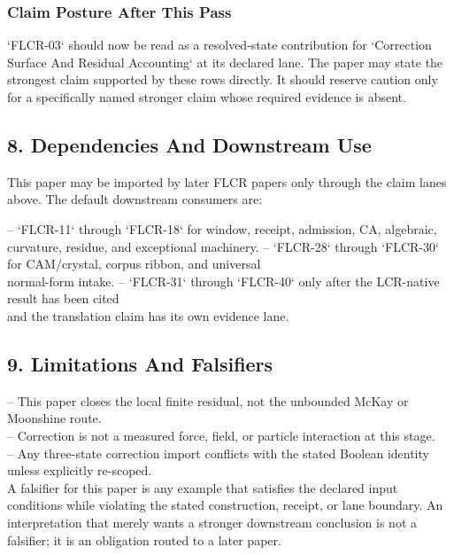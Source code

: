 \documentclass[11pt]{article}
\begin{document}
\subsubsection*{Claim Posture After This Pass}

`FLCR-03` should now be read as a resolved-state contribution for `Correction Surface And Residual Accounting` at its declared lane. The paper may state the strongest claim supported by these rows directly. It should reserve caution only for a specifically named stronger claim whose required evidence is absent.

\subsection*{8. Dependencies And Downstream Use}

This paper may be imported by later FLCR papers only through the claim lanes
above. The default downstream consumers are:

\noindent{}-- `FLCR-11` through `FLCR-18` for window, receipt, admission, CA, algebraic,\\
  curvature, residue, and exceptional machinery.
\noindent{}-- `FLCR-28` through `FLCR-30` for CAM/crystal, corpus ribbon, and universal\\
  normal-form intake.
\noindent{}-- `FLCR-31` through `FLCR-40` only after the LCR-native result has been cited\\
  and the translation claim has its own evidence lane.

\subsection*{9. Limitations And Falsifiers}

\noindent{}-- This paper closes the local finite residual, not the unbounded McKay or Moonshine route.\\
\noindent{}-- Correction is not a measured force, field, or particle interaction at this stage.\\
\noindent{}-- Any three-state correction import conflicts with the stated Boolean identity unless explicitly re-scoped.\\

A falsifier for this paper is any example that satisfies the declared input
conditions while violating the stated construction, receipt, or lane boundary.
An interpretation that merely wants a stronger downstream conclusion is not a
falsifier; it is an obligation routed to a later paper.
\end{document}
